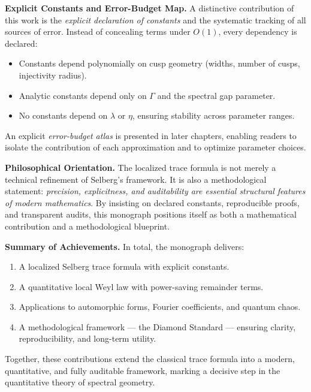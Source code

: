 \medskip
\noindent\textbf{Explicit Constants and Error-Budget Map.}
A distinctive contribution of this work is the \emph{explicit declaration of
constants} and the systematic tracking of all sources of error. Instead of
concealing terms under $O(1)$, every dependency is declared:
\begin{itemize}
  \item Constants depend polynomially on cusp geometry (widths, number of cusps,
  injectivity radius).
  \item Analytic constants depend only on $\Gamma$ and the spectral gap
  parameter.
  \item No constants depend on $\lambda$ or $\eta$, ensuring stability across
  parameter ranges.
\end{itemize}
An explicit \emph{error-budget atlas} is presented in later chapters, enabling
readers to isolate the contribution of each approximation and to optimize
parameter choices.

\medskip
\noindent\textbf{Philosophical Orientation.}
The localized trace formula is not merely a technical refinement of Selberg’s
framework. It is also a methodological statement: \emph{precision,
explicitness, and auditability are essential structural features of modern
mathematics}. By insisting on declared constants, reproducible proofs, and
transparent audits, this monograph positions itself as both a mathematical
contribution and a methodological blueprint.

\medskip
\noindent\textbf{Summary of Achievements.}
In total, the monograph delivers:
\begin{enumerate}
  \item A localized Selberg trace formula with explicit constants.  
  \item A quantitative local Weyl law with power-saving remainder terms.  
  \item Applications to automorphic forms, Fourier coefficients, and quantum
  chaos.  
  \item A methodological framework --- the Diamond Standard --- ensuring
  clarity, reproducibility, and long-term utility.  
\end{enumerate}
Together, these contributions extend the classical trace formula into a modern,
quantitative, and fully auditable framework, marking a decisive step in the
quantitative theory of spectral geometry.

